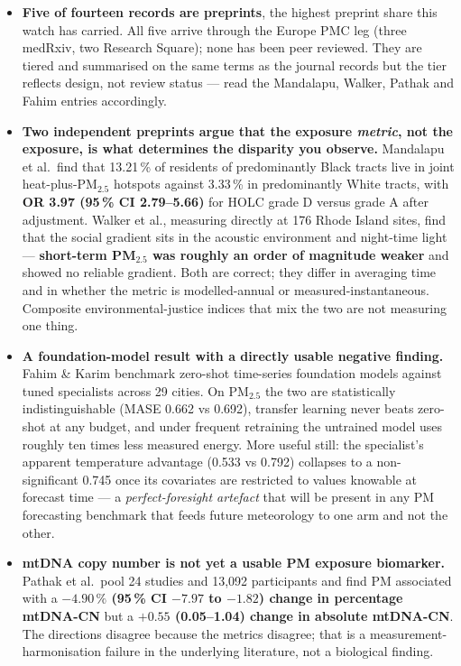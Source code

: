 \documentclass[10pt]{article}
\begin{document}
\footnotesize
\begin{itemize}\itemsep2pt
\item \textbf{Five of fourteen records are preprints}, the highest preprint share this
watch has carried. All five arrive through the Europe PMC leg (three medRxiv, two
Research Square); none has been peer reviewed. They are tiered and summarised on the same terms as the
journal records but the tier reflects design, not review status --- read the
Mandalapu, Walker, Pathak and Fahim entries accordingly.

\item \textbf{Two independent preprints argue that the exposure \emph{metric}, not the
exposure, is what determines the disparity you observe.} Mandalapu et al.\ find that
13.21\,\% of residents of predominantly Black tracts live in joint heat-plus-PM$_{2.5}$
hotspots against 3.33\,\% in predominantly White tracts, with \textbf{OR 3.97
(95\,\% CI 2.79--5.66)} for HOLC grade D versus grade A after adjustment. Walker et al.,
measuring directly at 176 Rhode Island sites, find that the social gradient sits in the
acoustic environment and night-time light --- \textbf{short-term PM$_{2.5}$ was roughly an
order of magnitude weaker} and showed no reliable gradient. Both are correct; they differ
in averaging time and in whether the metric is modelled-annual or measured-instantaneous.
Composite environmental-justice indices that mix the two are not measuring one thing.

\item \textbf{A foundation-model result with a directly usable negative finding.}
Fahim \& Karim benchmark zero-shot time-series foundation models against tuned
specialists across 29 cities. On PM$_{2.5}$ the two are statistically indistinguishable
(MASE 0.662 vs 0.692), transfer learning never beats zero-shot at any budget, and under
frequent retraining the untrained model uses roughly ten times less measured energy.
More useful still: the specialist's apparent temperature advantage (0.533 vs 0.792)
collapses to a non-significant 0.745 once its covariates are restricted to values
knowable at forecast time --- a \emph{perfect-foresight artefact} that will be present in
any PM forecasting benchmark that feeds future meteorology to one arm and not the other.

\item \textbf{mtDNA copy number is not yet a usable PM exposure biomarker.} Pathak et al.\
pool 24 studies and 13,092 participants and find PM associated with a
\textbf{$-4.90\,\%$ (95\,\% CI $-7.97$ to $-1.82$) change in percentage mtDNA-CN} but a
\textbf{$+0.55$ (0.05--1.04) change in absolute mtDNA-CN}. The directions disagree
because the metrics disagree; that is a measurement-harmonisation failure in the
underlying literature, not a biological finding.


\end{itemize}
\end{document}

